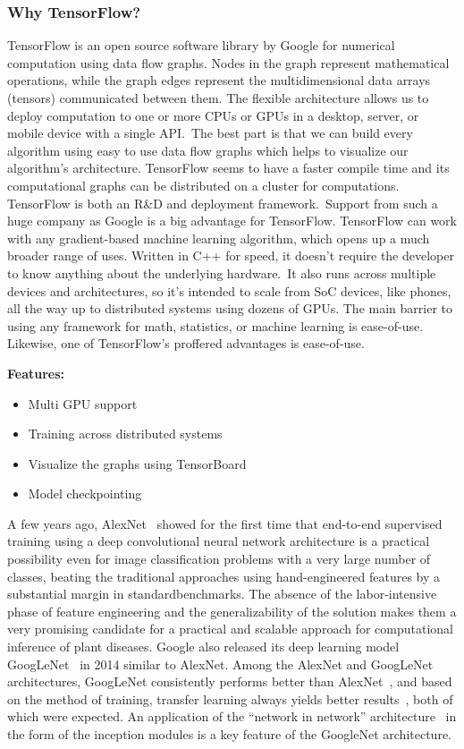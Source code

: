 \subsubsection{Why TensorFlow?}
TensorFlow is an open source software library by Google for numerical computation using data flow graphs. Nodes in the graph represent mathematical operations, while the graph edges represent the multidimensional data arrays (tensors) communicated between them. The flexible architecture allows us to deploy computation to one or more CPUs or GPUs in a desktop, server, or mobile device with a single API. The best part is that we can build every algorithm using easy to use data flow graphs which helps to visualize our algorithm’s architecture. TensorFlow seems to have a faster compile time and its computational graphs can be distributed on a cluster for computations. TensorFlow is both an R\&D and deployment framework. Support from such a huge company as Google is a big advantage for TensorFlow. TensorFlow can work with any gradient-based machine learning algorithm, which opens up a much broader range of uses. Written in C++ for speed, it doesn't require the developer to know anything about the underlying hardware. It also runs across multiple devices and architectures, so it's intended to scale from SoC devices, like phones, all the way up to distributed systems using dozens of GPUs. The main barrier to using any framework for math, statistics, or machine learning is ease-of-use. Likewise, one of TensorFlow's proffered advantages is ease-of-use. 

\textbf{Features:}


\begin{itemize}
	\item Multi GPU support
	\item Training across distributed systems
	\item Visualize the graphs using TensorBoard
	\item Model checkpointing
\end{itemize}


A few years ago, AlexNet~\cite{hughes2015open} showed for the first time that end-to-end supervised training using a deep convolutional neural network architecture is a practical possibility even for image classification problems with a very large number of classes, beating the traditional approaches using hand-engineered features by a substantial margin in standardbenchmarks. The absence of the labor-intensive phase of feature engineering and the generalizability of the solution makes them a very promising candidate for a practical and scalable approach for computational inference of plant diseases. Google also released its deep learning model GoogLeNet~\cite{szegedy2015going} in 2014 similar to AlexNet. Among the AlexNet and GoogLeNet architectures, GoogLeNet consistently performs better than AlexNet~\cite{mohanty2016using}, and based on the method of training, transfer learning always yields better results~\cite{mohanty2016using}, both of which were expected. An application of the ``network in network'' architecture~\cite{prince2015automatic} in the form of the inception modules is a key feature of the GoogleNet architecture.

